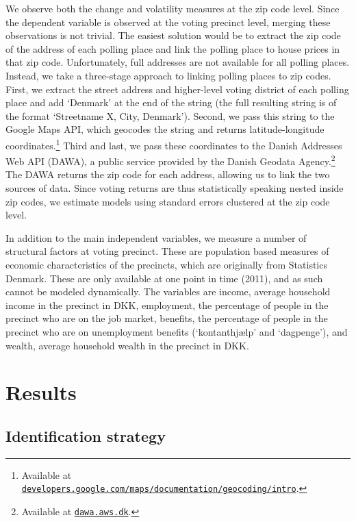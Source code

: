 \documentclass[12pt,a4paper]{article}
\begin{document}
We observe both the change and volatility measures at the zip code level. Since the dependent variable is observed at the voting precinct level, merging these observations is not trivial. The easiest solution would be to extract the zip code of the address of each polling place and link the polling place to house prices in that zip code. Unfortunately, full addresses are not available for all polling places. Instead, we take a three-stage approach to linking polling places to zip codes. First, we extract the street address and higher-level voting district of each polling place and add `Denmark' at the end of the string (the full resulting string is of the format `Streetname X, City, Denmark'). Second, we pass this string to the Google Maps API, which geocodes the string and returns latitude-longitude coordinates.\footnote{Available at \texttt{\href{https://developers.google.com/maps/documentation/geocoding/intro}{developers.google.com/maps/documentation/geocoding/intro}}.} Third and last, we pass these coordinates to the Danish Addresses Web API (DAWA), a public service provided by the Danish Geodata Agency.\footnote{Available at \texttt{\href{http://dawa.aws.dk/}{dawa.aws.dk}}.} The DAWA returns the zip code for each address, allowing us to link the two sources of data. Since voting returns are thus statistically speaking nested inside zip codes, we estimate models using standard errors clustered at the zip code level.

In addition to the main independent variables, we measure a number of structural factors at voting precinct. These are population based measures of economic characteristics of the precincts, which are originally from Statistics Denmark. These are only available at one point in time (2011), and as such cannot be modeled dynamically. The variables are income, average household income in the precinct in DKK, employment, the percentage of people in the precinct who are on the job market, benefits, the percentage of people in the precinct who are on unemployment benefits (`kontanthjælp' and `dagpenge'), and wealth, average household wealth in the precinct in DKK.  


\section{Results}

\subsection{Identification strategy}
\end{document}
